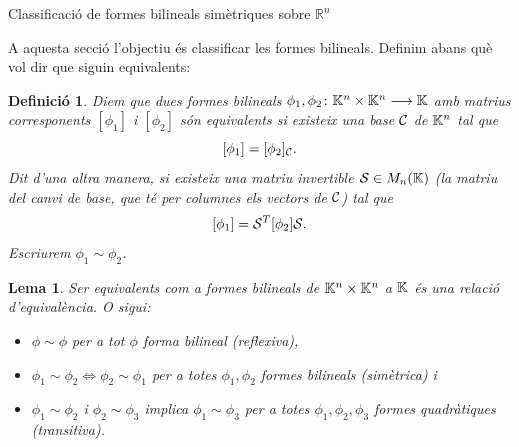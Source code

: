 \documentclass[
  11pt,
]{book}
\makeatletter
\numberwithin{dummy}{section}
\theoremstyle{maincolornumbox}
\theoremstyle{blacknumex}
\theoremstyle{blacknumbox}
\newtheorem{definitionT}{Definició}[chapter]
\theoremstyle{maincolornum}
\newtheorem{lemmaT}{Lema}[chapter]
\newenvironment{lemma}{\begin{pBox}\begin{lemmaT}}{\end{lemmaT}\end{pBox}}
\newenvironment{definition}{\begin{dBox}\begin{definitionT}}{\end{definitionT}\end{dBox}}
\renewcommand{\section}{\@startsection{section}{1}{\z@}
{-4ex \@plus -1ex \@minus -.4ex}
{1ex \@plus.2ex }
{\normalfont\large\sffamily\bfseries}}
\newlength\esp
\makeatother
\begin{document}
\section{\texorpdfstring{Classificació de formes bilineals simètriques sobre \(\mathbb{R}^n\)}{Classificació de formes bilineals simètriques sobre \textbackslash mathbb\{R\}\^{}n}}\label{classificaciuxf3-de-formes-bilineals-simuxe8triques-sobre-mathbbrn}

A aquesta secció l'objectiu és classificar les formes bilineals. Definim
abans què vol dir que siguin equivalents:

\begin{definition}
Diem que dues formes bilineals
\(\phi_1,\phi_2\colon \mathbb{K}^n\times\mathbb{K}^n\longrightarrow \mathbb{K}\) amb matrius corresponents
\([\phi_1]\) i \([\phi_2]\) \emph{són equivalents} si existeix una base \(\mathcal{C}\)
de \(\mathbb{K}^n\) tal que \[[\phi_1]=[\phi_2]_{\mathcal{C}} .\] Dit d'una altra manera,
si existeix una matriu invertible \(\mathcal{S}\in M_n(\mathbb{K})\) (la matriu del
canvi de base, que té per columnes els vectors de \(\mathcal{C}\)) tal que
\[[\phi_1]=\mathcal{S}^T [\phi_2] \mathcal{S}.\] Escriurem \(\phi_1\sim \phi_2\).
\end{definition}

\begin{lemma}

Ser equivalents com a formes bilineals de \(\mathbb{K}^n\times \mathbb{K}^n\) a \(\mathbb{K}\) és
una relació d'equivalència. O sigui:

\begin{itemize}
\item
  \(\phi \sim \phi\) per a tot \(\phi\) forma bilineal (reflexiva),
\item
  \(\phi_1\sim \phi_2 \Leftrightarrow \phi_2 \sim \phi_1\) per a totes
  \(\phi_1, \phi_2\) formes bilineals (simètrica) i
\item
  \(\phi_1\sim \phi_2\) i \(\phi_2\sim \phi_3\) implica
  \(\phi_1\sim \phi_3\) per a totes \(\phi_1,\phi_2,\phi_3\) formes
  quadràtiques (transitiva).
\end{itemize}

\end{lemma}
\end{document}
